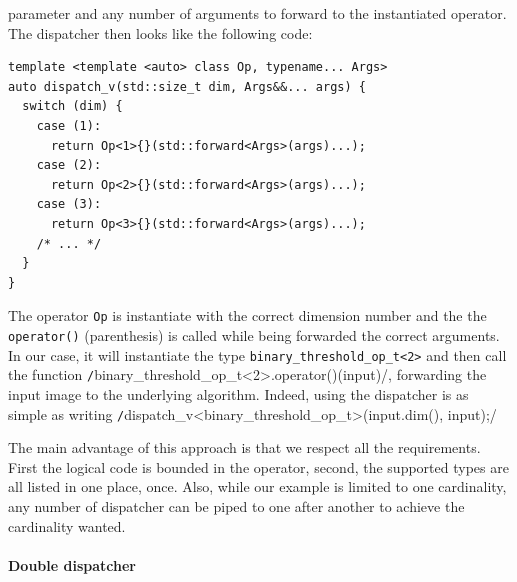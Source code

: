 parameter and any number of arguments to forward to the instantiated operator. The dispatcher then looks like the
following code:
\begin{verbatim}
template <template <auto> class Op, typename... Args>
auto dispatch_v(std::size_t dim, Args&&... args) {
  switch (dim) {
    case (1):
      return Op<1>{}(std::forward<Args>(args)...);
    case (2):
      return Op<2>{}(std::forward<Args>(args)...);
    case (3):
      return Op<3>{}(std::forward<Args>(args)...);
    /* ... */
  }
}
\end{verbatim}
The operator \texttt{Op} is instantiate with the correct dimension number and the the \texttt{operator()} (parenthesis)
is called while being forwarded the correct arguments. In our case, it will instantiate the type
\texttt{binary\_threshold\_op\_t<2>} and then call the function
\texttt/binary_threshold_op_t<2>.operator()(input)/, forwarding the input image to the underlying algorithm.
Indeed, using the dispatcher is as simple as writing \texttt/dispatch_v<binary_threshold_op_t>(input.dim(),
input);/

The main advantage of this approach is that we respect all the requirements. First the logical code is bounded in the
operator, second, the supported types are all listed in one place, once. Also, while our example is limited to one
cardinality, any number of dispatcher can be piped to one after another to achieve the cardinality wanted.


\paragraph{Double dispatcher}

